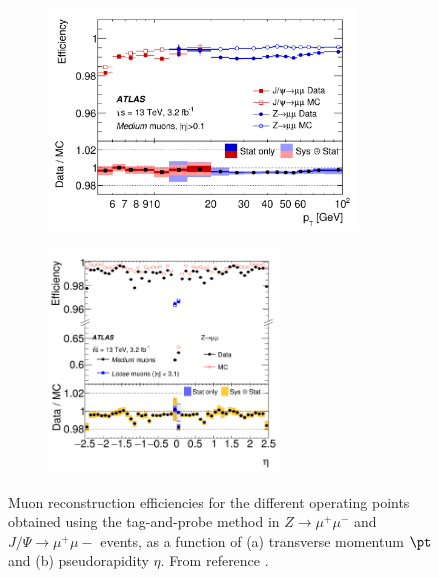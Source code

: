 \begin{figure}[h!]
\begin{subfigure}{0.5\textwidth}
  \centering
  \includegraphics[width=0.9\textwidth]{figures/Objects/muoneffpt.png}
  \caption{}
  \label{sec:obj:fig:muoneffpt}
\end{subfigure}
\begin{subfigure}{0.5\textwidth}
  \centering
  \includegraphics[width=0.675\textwidth]{figures/Objects/muoneffeta.png}
  \caption{}
  \label{sec:obj:fig:muoneffeta}
\end{subfigure}

\captionsetup{width=0.85\textwidth} \caption{\small Muon reconstruction efficiencies for the different operating points obtained using the tag-and-probe method in $Z\to \mu^{+}\mu^{-}$ and $J/\Psi \to \mu^{+}\mu{-}$ events, as a function of  (a) transverse momentum $\pt$ and (b) pseudorapidity $\eta$. From reference \cite{Aad:2016jkr}.}
\label{sec:obj:fig:muoneff}
\end{figure}

